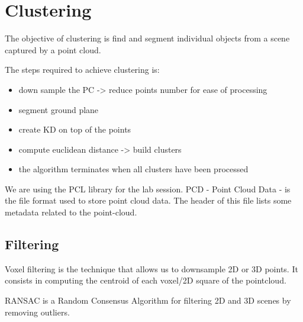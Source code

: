 \chapter{Clustering}
The objective of clustering is find and segment individual objects from a scene captured by a point cloud.

The steps required to achieve clustering is:
\begin{itemize}
  \item down sample the PC -> reduce points number for ease of processing
  \item segment ground plane
  \item create KD on top of the points
  \item compute euclidean distance -> build clusters
  \item the algorithm terminates when all clusters have been processed
\end{itemize}

We are using the PCL library for the lab session.
PCD - Point Cloud Data - is the file format used to store point cloud data.
The header of this file lists some metadata related to the point-cloud.

\section{Filtering}
Voxel filtering is the technique that allows us to downsample 2D or 3D points.
It consists in computing the centroid of each voxel/2D square of the pointcloud.

RANSAC is a Random Consensus Algorithm for filtering 2D and 3D scenes by removing outliers.